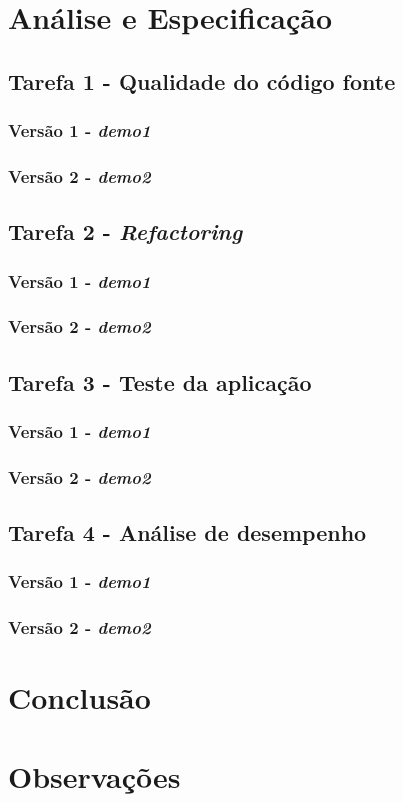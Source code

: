 \documentclass[a4paper]{report}
\begin{document}
\chapter{Análise e Especificação}
\section{Tarefa 1 - Qualidade do código fonte}
\subsection{Versão 1 - \textit{demo1}}
\subsection{Versão 2 - \textit{demo2}}

\section{Tarefa 2 - \textit{Refactoring}}
\subsection{Versão 1 - \textit{demo1}}
\subsection{Versão 2 - \textit{demo2}}

\section{Tarefa 3 - Teste da aplicação}
\subsection{Versão 1 - \textit{demo1}}
\subsection{Versão 2 - \textit{demo2}}

\section{Tarefa 4 - Análise de desempenho}
\subsection{Versão 1 - \textit{demo1}}
\subsection{Versão 2 - \textit{demo2}}

\chapter{Conclusão}

\appendix
\chapter{Observações}
\end{document}
